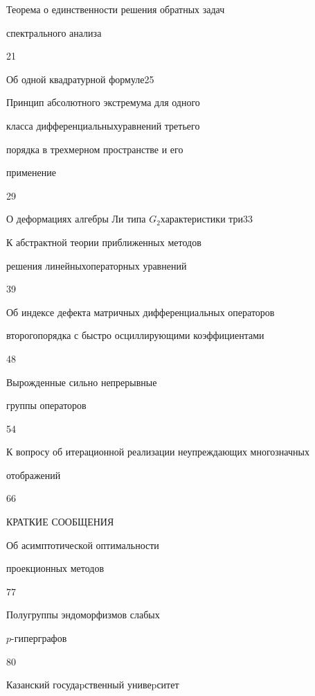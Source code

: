 {Теорема о единственности решения обратных задач\newline


спектрального анализа}{21}




{Об одной квадратурной формуле}{25}




{Принцип абсолютного экстремума для одного 


класса дифференциальных\newline уравнений третьего 


порядка в трехмерном пространстве и его 


применение}{29}




{О деформациях алгебры Ли типа $G_{2}$\newline характеристики три}{33}




{К абстрактной теории приближенных методов 


решения линейных\newline операторных уравнений}{39}




{Об индексе дефекта матричных дифференциальных операторов 


второго\newline порядка с быстро осциллирующими коэффициентами}{48}




{Вырожденные сильно непрерывные


группы операторов}{54}




{К вопросу об итерационной реализации неупреждающих многозначных\newline


отображений}{66}





\bigskip


{\centerline {КРАТКИЕ СООБЩЕНИЯ}}


\bigskip







{Об асимптотической оптимальности 


проекционных методов}{77}




{Полугруппы эндоморфизмов слабых 


$p$-гиперграфов}{80}








\vfill


\noindent\raisebox{2pt}{\copyright} Казанский госудаpственный унивеpситет






